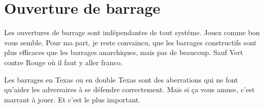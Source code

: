\documentclass[a4paper,12pt, french]{book}
\begin{document}
\section*{Ouverture de barrage}

Les ouvertures de barrage sont indépendantes de tout système. Jouez comme bon vous semble. Pour ma part, je reste convaincu, que les barrages constructifs sont plus efficaces que les barrages anarchiques, mais pas de beaucoup. Sauf Vert contre Rouge où il faut y aller franco.

Les barrages en Texas ou en double Texas sont des aberrations qui ne font qu'aider les adversaires à se défendre correctement.
Mais si ça vous amuse, c'est marrant à jouer. Et c'est le plus important.
\end{document}
